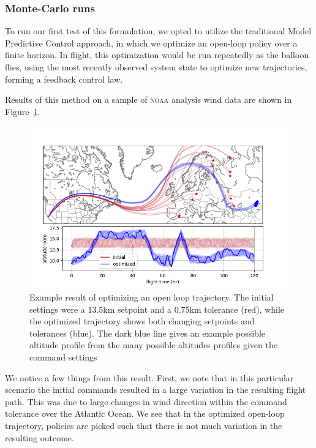 \documentclass[11pt]{scrartcl} %
\begin{document}
\subsubsection{Monte-Carlo runs}

To run our first test of this formulation, we opted to utilize the traditional Model Predictive Control approach, in which we optimize an open-loop policy over a finite horizon. In flight, this optimization would be run repeatedly as the balloon flies, using the most recently observed system state to optimize new trajectories, forming a feedback control law. 

Results of this method on a sample of \textsc{noaa} analysis wind data are shown in Figure~\ref{openloop}.
\begin{figure}[h]
\includegraphics[width=\linewidth]{datasheetfig.png}
\caption{Example result of optimizing an open loop trajectory. The initial settings were a 13.5km setpoint and a 0.75km tolerance (red), while the optimized trajectory shows both changing setpoints and tolerances (blue). The dark blue line gives an example possible altitude profile from the many possible altitudes profiles given the command settings}
\label{openloop}
\end{figure}

We notice a few things from this result. First, we note that in this particular scenario the initial commands resulted in a large variation in the resulting flight path. This was due to large changes in wind direction within the command tolerance over the Atlantic Ocean. We see that in the optimized open-loop trajectory, policies are picked such that there is not much variation in the resulting outcome. 


\newpage
\end{document}
